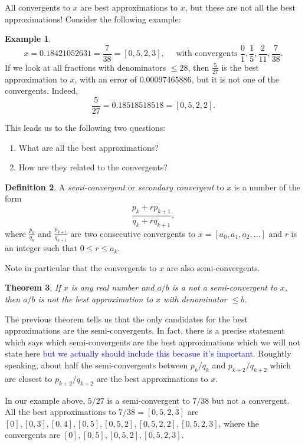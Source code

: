 \documentclass[11pt]{report}
\newtheorem{theorem}{Theorem}[section]
\theoremstyle{definition}
\newtheorem{definition}[theorem]{Definition}
\newtheorem{example}[theorem]{Example}
\newcommand{\edit}[1]{\textcolor{blue}{#1}}
\begin{document}
All convergents to $x$ are best approximations to $x$, but these are not all the best approximations! Consider the following example:
\begin{example}
  \[x = 0.18421052631 = \frac{7}{38} = [0,5,2,3], \quad \text{ with convergents } \frac{0}{1}, \frac{1}{5}, \frac{2}{11}, \frac{7}{38}.\]
  If we look at all fractions with denominators $\leq 28$, then $\frac{5}{27}$ is the best approximation to $x$, with an error of $0.00097465886$, but it is not one of the convergents. Indeed,
  \[\frac{5}{27} = 0.18518518518 = [0,5,2,2].\]
\end{example}

This leads us to the following two questions:
\begin{enumerate}
\item What are all the best approximations?
\item How are they related to the convergents?
\end{enumerate}

\begin{definition}
  A \textit{semi-convergent} or \textit{secondary convergent} to $x$ is a number of the form
  \[\frac{p_k +r p_{k+1}}{q_k + rq_{k+1}},\]
  where $\frac{p_k}{q_k}$ and $\frac{p_{k+1}}{q_{k+1}}$ are two consecutive convergents to $x = [a_0,a_1,a_2,\dots]$ and $r$ is an integer such that $0 \leq r \leq a_k$.
\end{definition}
Note in particular that the convergents to $x$ are also semi-convergents.
\begin{theorem}
  If $x$ is any real number and $a/b$ is a not a semi-convergent to $x$, then $a/b$ is not the best approximation to $x$ with denominator $\leq b$.
\end{theorem}
The previous theorem tells us that the only candidates for the best approximations are the semi-convergents. In fact, there is a precise statement which says which semi-convergents are the best approximations which we will not state here \edit{but we actually should include this becasue it's important}. Roughtly speaking, about half the semi-convergents between $p_k/q_k$ and $p_{k+2}/q_{k+2}$ which are closest to $p_{k+2}/q_{k+2}$ are the best approximations to $x$.

In our example above, $5/27$ is a semi-convergent to $7/38$ but not a convergent. All the best approximations to $7/38 = [0,5,2,3]$ are $[0],[0,3],[0,4],[0,5],[0,5,2],[0,5,2,2],[0,5,2,3]$, where the convergents are $[0],[0,5],[0,5,2],[0,5,2,3]$.
\end{document}

